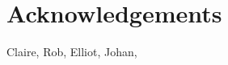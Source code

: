 \thispagestyle{plain}
\newpage
\appendix
\section{Acknowledgements}\label{sec:acknowledgements}

\normalsize

Claire, Rob, Elliot, Johan, 
